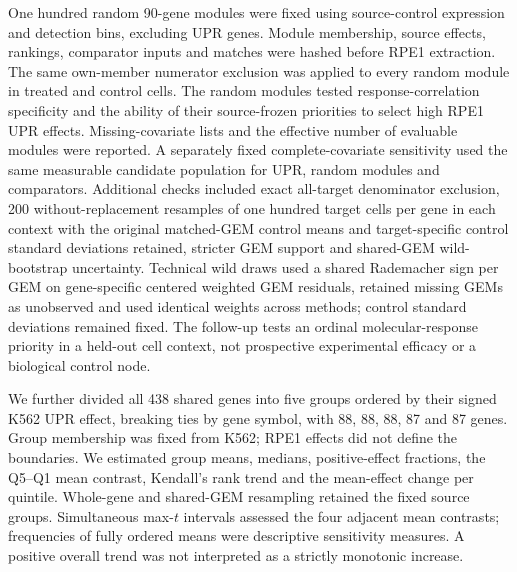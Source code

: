 \documentclass[a4paper,fleqn]{cas-sc}
\makeatletter
\DeclareRobustCommand{\rev}[1]{{\color{red}\def\@citecolor{black}\def\@linkcolor{red}\def\@urlcolor{red}#1}}
\makeatother
\begin{document}
\rev{One hundred random 90-gene modules were fixed using source-control expression and detection bins, excluding UPR genes.} \rev{Module membership, source effects, rankings, comparator inputs and matches were hashed before RPE1 extraction.} \rev{The same own-member numerator exclusion was applied to every random module in treated and control cells.} \rev{The random modules tested response-correlation specificity and the ability of their source-frozen priorities to select high RPE1 UPR effects.} \rev{Missing-covariate lists and the effective number of evaluable modules were reported.} \rev{A separately fixed complete-covariate sensitivity used the same measurable candidate population for UPR, random modules and comparators.} \rev{Additional checks included exact all-target denominator exclusion, 200 without-replacement resamples of one hundred target cells per gene in each context with the original matched-GEM control means and target-specific control standard deviations retained, stricter GEM support and shared-GEM wild-bootstrap uncertainty.} \rev{Technical wild draws used a shared Rademacher sign per GEM on gene-specific centered weighted GEM residuals, retained missing GEMs as unobserved and used identical weights across methods; control standard deviations remained fixed.} \rev{The follow-up tests an ordinal molecular-response priority in a held-out cell context, not prospective experimental efficacy or a biological control node.}

\rev{We further divided all 438 shared genes into five groups ordered by their signed K562 UPR effect, breaking ties by gene symbol, with 88, 88, 88, 87 and 87 genes.} \rev{Group membership was fixed from K562; RPE1 effects did not define the boundaries.} \rev{We estimated group means, medians, positive-effect fractions, the Q5--Q1 mean contrast, Kendall's rank trend and the mean-effect change per quintile.} \rev{Whole-gene and shared-GEM resampling retained the fixed source groups.} \rev{Simultaneous max-$t$ intervals assessed the four adjacent mean contrasts; frequencies of fully ordered means were descriptive sensitivity measures.} \rev{A positive overall trend was not interpreted as a strictly monotonic increase.}
\end{document}
